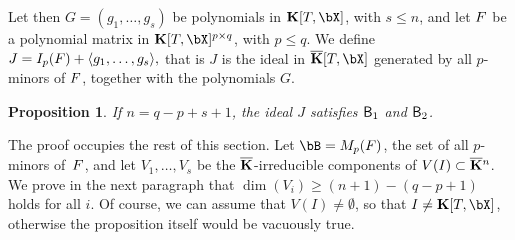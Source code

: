 \documentclass[12pt]{article}
\newtheorem{proposition}[definition]{Proposition}
\begin{document}



Let then $G=(g_1,\dots,g_s)$ be polynomials in $\KK[T,\bX]$, with $s
\le n$, and let ${F}$ be a polynomial matrix in $\KK[T,\bX]^{p \times
  q}$, with $p \le q$. We define $J = I_p({F}) + \langle
g_1,\dots,g_s\rangle,$ that is $J$ is the ideal in $\KKbar[T,\bX]$
generated by all $p$-minors of ${F}$, together with the polynomials
$G$.

\begin{proposition}\label{prop:KH1H2}
  If $n=q-p+s+1$, the ideal $J$ satisfies $\mathsf{B}_1$ and $\mathsf{B}_2$.
\end{proposition}

The proof occupies the rest of this section.  Let $\bB=M_p(\mF)$, the
set of all $p$-minors of~${F}$, and let $V_1,\dots,V_s$ be the
$\overline{\mathbf{K}}$-irreducible components of $V(I)\subset \overline{\mathbf{K}}{}^n$.  We prove
in the next paragraph that $\dim(V_i) \ge (n+1) -(q-p+1)$ holds for
all $i$. Of course, we can assume that $V(I)\ne \emptyset$, so that $I
\ne \KK[T,\bX]$, otherwise the proposition itself would be vacuously true.
\end{document}
